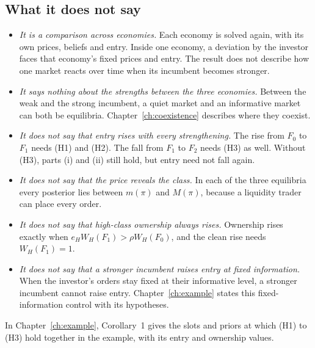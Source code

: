 \subsection{What it does not say}

\begin{itemize}
\item \emph{It is a comparison across economies.} Each economy is solved again, with its own prices, beliefs and
  entry. Inside one economy, a deviation by the investor faces that economy's fixed prices and entry. The result does
  not describe how one market reacts over time when its incumbent becomes stronger.
\item \emph{It says nothing about the strengths between the three economies.} Between the weak and the strong
  incumbent, a quiet market and an informative market can both be equilibria. Chapter~\ref{ch:coexistence} describes
  where they coexist.
\item \emph{It does not say that entry rises with every strengthening.} The rise from \(F_0\) to \(F_1\) needs (H1)
  and (H2). The fall from \(F_1\) to \(F_2\) needs (H3) as well. Without (H3), parts (i) and (ii) still hold, but
  entry need not fall again.
\item \emph{It does not say that the price reveals the class.} In each of the three equilibria every posterior lies
  between \(m(\pi)\) and \(M(\pi)\), because a liquidity trader can place every order.
\item \emph{It does not say that high-class ownership always rises.} Ownership rises exactly when
  \(e_HW_H(F_1)>\rho W_H(F_0)\), and the clean rise needs \(W_H(F_1)=1\).
\item \emph{It does not say that a stronger incumbent raises entry at fixed information.} When the investor's orders
  stay fixed at their informative level, a stronger incumbent cannot raise entry. Chapter~\ref{ch:example} states
  this fixed-information control with its hypotheses.
\end{itemize}

In Chapter~\ref{ch:example}, Corollary~1 gives the slots and priors at which (H1) to (H3) hold together in the
example, with its entry and ownership values.

